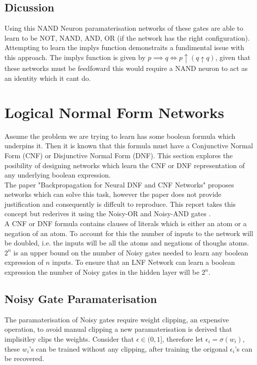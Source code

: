 \subsection{Dicussion}
Using this NAND Neuron paramaterisation networks of these gates are able to learn to be NOT, NAND, AND, OR (if the network has the right configuration). Attempting to learn the implys function demonstraits a fundimental issue with this approach. The implys function is given by $p \implies q \iff p \uparrow (q \uparrow q)$, given that these networks must be feedfoward this would require a NAND neuron to act as an identity which it cant do.

\section{Logical Normal Form Networks}
Assume the problem we are trying to learn has some boolean formula which underpins it. Then it is known that this formula must have a Conjunctive Normal Form (CNF) or Disjunctive Normal Form (DNF). This section explores the posibility of designing networks which learn the CNF or DNF representation of any underlying boolean expression.\\

The paper "Backpropagation for Neural DNF and CNF Networks" \cite{herrmann1996backpropagation} proposes networks which can solve this task, however the paper does not provide justification and consequently is diffcult to reproduce. This report takes this concept but rederives it using the Noisy-OR and Noisy-AND gates \cite{LearningLogicalActivations}.\\

A CNF or DNF formula contains clauses of literals which is either an atom or a negation of an atom. To account for this the number of inputs to the network will be doubled, i.e. the inputs will be all the atoms and negations of thoughs atoms. $2^n$ is an upper bound on the number of Noisy gates needed to learn any boolean expression of $n$ inputs. To ensure that an LNF Network can learn a boolean expression the number of Noisy gates in the hidden layer will be $2^n$.

\subsection{Noisy Gate Paramaterisation} 
The paramaterisation of Noisy gates require weight clipping, an expensive operation, to avoid manual clipping a new paramaterisation is derived that implisitley clips the weights. Consider that $\epsilon \in (0, 1]$, therefore let $\epsilon_i = \sigma(w_i)$, these $w_i$'s can be trained without any clipping, after training the origonal $\epsilon_i$'s can be recovered.\\

